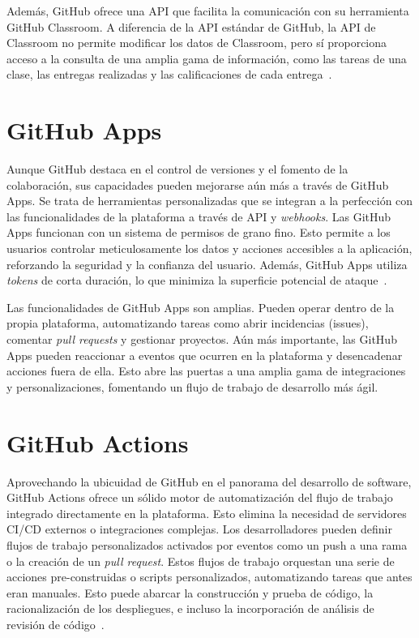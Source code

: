 Además, GitHub ofrece una \acrshort{API} que facilita la comunicación con su herramienta GitHub Classroom. A diferencia de la \acrshort{API} estándar de GitHub, la \acrshort{API} de Classroom no permite modificar los datos de Classroom, pero sí proporciona acceso a la consulta de una amplia gama de información, como las tareas de una clase, las entregas realizadas y las calificaciones de cada entrega~\cite{ClassroomAPI}.

\section{GitHub Apps}
Aunque GitHub destaca en el control de versiones y el fomento de la colaboración, sus capacidades pueden mejorarse aún más a través de GitHub Apps. Se trata de herramientas personalizadas que se integran a la perfección con las funcionalidades de la plataforma a través de \acrshort{API} y \textit{webhooks}. Las  GitHub Apps funcionan con un sistema de permisos de grano fino. Esto permite a los usuarios controlar meticulosamente los datos y acciones accesibles a la aplicación, reforzando la seguridad y la confianza del usuario. Además, GitHub Apps utiliza \textit{tokens} de corta duración, lo que minimiza la superficie potencial de ataque~\cite{githubAboutApps}.

Las funcionalidades de GitHub Apps son amplias. Pueden operar dentro de la propia plataforma, automatizando tareas como abrir incidencias (issues), comentar \textit{pull requests} y gestionar proyectos. Aún más importante, las GitHub Apps pueden reaccionar a eventos que ocurren en la plataforma y desencadenar acciones fuera de ella. Esto abre las puertas a una amplia gama de integraciones y personalizaciones, fomentando un flujo de trabajo de desarrollo más ágil.

\section{GitHub Actions}
Aprovechando la ubicuidad de GitHub en el panorama del desarrollo de software, GitHub Actions ofrece un sólido motor de automatización del flujo de trabajo integrado directamente en la plataforma. Esto elimina la necesidad de servidores \acrshort{CI/CD} externos o integraciones complejas. Los desarrolladores pueden definir flujos de trabajo personalizados activados por eventos como un push a una rama o la creación de un \textit{pull request}. Estos flujos de trabajo orquestan una serie de acciones pre-construidas o scripts personalizados, automatizando tareas que antes eran manuales.  Esto puede abarcar la construcción y prueba de código, la racionalización de los despliegues, e incluso la incorporación de análisis de revisión de código~\cite{githubUnderstandingActions}.

